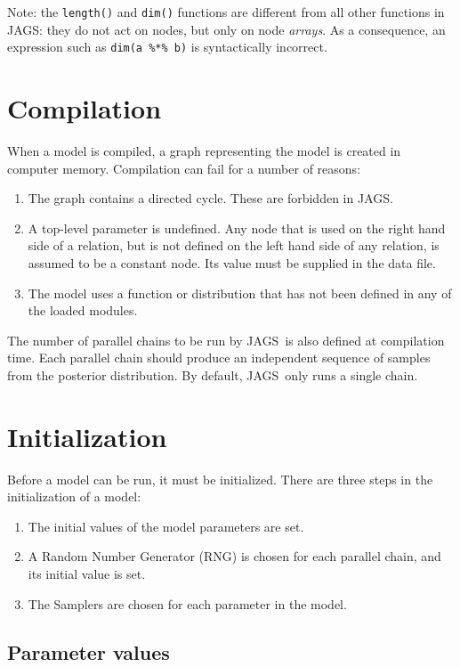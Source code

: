 \documentclass[11pt, a4paper, titlepage]{report}
\newcommand{\JAGS}{\textsf{JAGS}}
\begin{document}
Note: the \verb+length()+ and \verb+dim()+ functions are different
from all other functions in \JAGS: they do not act on nodes, but only
on node {\em arrays}. As a consequence, an expression such as
\verb+dim(a %*% b)+ is syntactically incorrect.

\section{Compilation}

When a model is compiled, a graph representing the model is created in
computer memory. Compilation can fail for a number of reasons:
\begin{enumerate}
\item The graph contains a directed cycle.  These are forbidden
in \JAGS.
\item A top-level parameter is undefined. Any node that is used on
the right hand side of a relation, but is not defined on the left
hand side of any relation, is assumed to be a constant node. Its value
must be supplied in the data file. 
\item The model uses a function or distribution that has not been
defined in any of the loaded modules.
\end{enumerate}
The number of parallel chains to be run by \JAGS\ is also defined at
compilation time.  Each parallel chain should produce an independent
sequence of samples from the posterior distribution. By default,
\JAGS\ only runs a single chain.

\section{Initialization}

Before a model can be run, it must be initialized. There are three
steps in the initialization of a model:
\begin{enumerate}
\item The initial values of the model parameters are set.
\item A Random Number Generator (RNG) is chosen for each parallel chain,
  and its initial value is set.
\item The Samplers are chosen for each parameter in the model. 
\end{enumerate}

\subsection{Parameter values}
\end{document}
